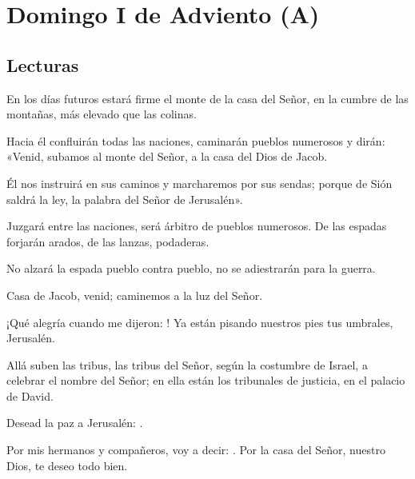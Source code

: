 \chapter{Domingo I de Adviento (A)}

\section{Lecturas}


 


\begin{readprose}
	En los días futuros estará firme	
	el monte de la casa del Señor, 
	en la cumbre de las montañas, 	
	más elevado que las colinas. 	
	
	Hacia él confluirán todas las naciones, 	
	caminarán pueblos numerosos y dirán: 	
	«Venid, subamos al monte del Señor, 	
	a la casa del Dios de Jacob. 
	
	Él nos instruirá en sus caminos 
	y marcharemos por sus sendas; 	
	porque de Sión saldrá la ley, 	
	la palabra del Señor de Jerusalén». 
	
	Juzgará entre las naciones, 	
	será árbitro de pueblos numerosos. 	
	De las espadas forjarán arados, 	
	de las lanzas, podaderas. 
	
	No alzará la espada pueblo contra pueblo, 	
	no se adiestrarán para la guerra. 
		
	Casa de Jacob, venid; 	
	caminemos a la luz del Señor.
\end{readprose}



 


\begin{psbody}
	¡Qué alegría cuando me dijeron: 
	! 
	Ya están pisando nuestros pies 
	tus umbrales, Jerusalén. 
	
	Allá suben las tribus, 
	las tribus del Señor, 
	según la costumbre de Israel, 
	a celebrar el nombre del Señor; 
	en ella están los tribunales de justicia, 
	en el palacio de David.
	
	Desead la paz a Jerusalén: 
	.
	
	Por mis hermanos y compañeros, 
	voy a decir: . 
	Por la casa del Señor, 
	nuestro Dios, te deseo todo bien.
\end{psbody}

